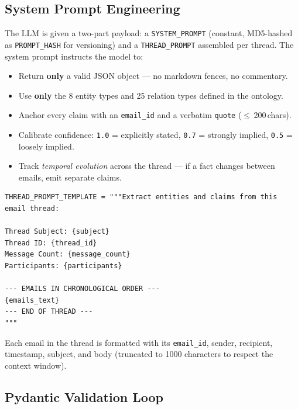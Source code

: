 \documentclass[12pt,a4paper]{article}
\begin{document}
\subsection{System Prompt Engineering}

The LLM is given a two-part payload: a \texttt{SYSTEM\_PROMPT} (constant, MD5-hashed as \texttt{PROMPT\_HASH} for versioning) and a \texttt{THREAD\_PROMPT} assembled per thread. The system prompt instructs the model to:

\begin{itemize}
    \item Return \textbf{only} a valid JSON object — no markdown fences, no commentary.
    \item Use \textbf{only} the 8 entity types and 25 relation types defined in the ontology.
    \item Anchor every claim with an \texttt{email\_id} and a verbatim \texttt{quote} ($\leq$\,200\,chars).
    \item Calibrate confidence: \texttt{1.0} = explicitly stated, \texttt{0.7} = strongly implied, \texttt{0.5} = loosely implied.
    \item Track \textit{temporal evolution} across the thread — if a fact changes between emails, emit separate claims.
\end{itemize}

\begin{lstlisting}[caption=Thread prompt template (02\_extract.py)]
THREAD_PROMPT_TEMPLATE = """Extract entities and claims from this email thread:

Thread Subject: {subject}
Thread ID: {thread_id}
Message Count: {message_count}
Participants: {participants}

--- EMAILS IN CHRONOLOGICAL ORDER ---
{emails_text}
--- END OF THREAD ---
"""
\end{lstlisting}

Each email in the thread is formatted with its \texttt{email\_id}, sender, recipient, timestamp, subject, and body (truncated to 1000 characters to respect the context window).

\subsection{Pydantic Validation Loop}
\end{document}
